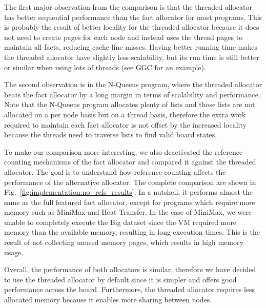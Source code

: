The first major observation from the comparison is that the threaded allocator
has better sequential performance than the fact allocator for most programs.
This is probably the result of better locality for the threaded allocator
because it does not need to create pages for each node and instead uses the
thread pages to maintain all facts, reducing cache line misses.  Having better
running time makes the threaded allocator have slightly less scalability, but
its run time is still better or similar when using lots of threads (see GGC for
an example).

The second observation is in the N-Queens program, where the threaded allocator
beats the fact allocator by a long margin in terms of scalability and
performance. Note that the N-Queens program allocates plenty of lists and those
lists are not allocated on a per node basis but on a thread basis, therefore the
extra work required to maintain each fact allocator is not offset by the
increased locality because the threads need to traverse lists to find valid
board states.

To make our comparison more interesting, we also deactivated the reference
counting mechanisms of the fact allocator and compared it against the threaded
allocator. The goal is to understand how reference counting affects the
performance of the alternative allocator. The complete comparison are shown in
Fig.~\ref{fig:implementation:no_refs_results}. In a nutshell, it performs almost
the same as the full featured fact allocator, except for programs which require
more memory such as MiniMax and Heat Transfer. In the case of MiniMax, we were
unable to completely execute the Big dataset since the VM required more memory
than the available memory, resulting in long execution times. This is the result
of not collecting unused memory pages, which results in high memory usage.



Overall, the performance of both allocators is similar, therefore we have
decided to use the threaded allocator by default since it is simpler and offers
good performance across the board. Furthermore, the threaded allocator requires
less allocated memory because it enables more sharing between nodes.

